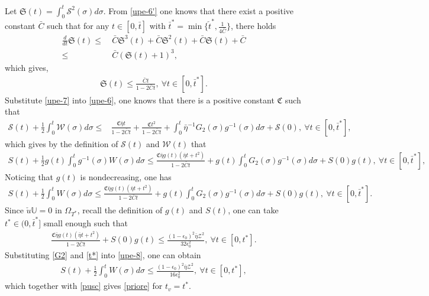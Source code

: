 \documentclass{amsart}
\numberwithin{equation}{section}
\begin{document}
Let $\mathfrak{S}(t)=\int_{0}^{t}\mathcal{S}^{2}(\sigma)d\sigma$. From \eqref{upe-6'} one knows that there exist a positive constant $\bar{C}$ such that for any $t\in[0,\bar{t}]$ with  $\bar{t}^{*}=\min\{\check{t}^{*},\frac{1}{4\bar{C}}\}$, there holds
\begin{align*}
\frac{d}{dt}\mathfrak{S}(t)
\leq&~\bar{C}\mathfrak{S}^{3}(t)
     +\bar{C}\mathfrak{S}^{2}(t)
     +\bar{C}\mathfrak{S}(t)
     +\bar{C}\\
\leq&~\bar{C}(\mathfrak{S}(t)+1)^{3},
\end{align*}
which gives,
\begin{align}\label{upe-7}
\mathfrak{S}(t)\leq \frac{\bar{C}t}{1-2\bar{C}t}, ~\forall t\in [0,\bar{t}^{*}].
\end{align}
Substitute \eqref{upe-7} into \eqref{upe-6}, one knows that there is a positive constant $\mathfrak{C}$ such that
\begin{align*}
\mathcal{S}(t)+\frac{1}{2}\int_{0}^{t}\mathcal{W}(\sigma)d\sigma
\leq& \frac{\mathfrak{C}\bar{\eta}t}{1-2\bar{C}t}
     +\frac{\mathfrak{C}t^{2}}{1-2\bar{C}t}
     +\int_{0}^{t}\bar{\eta}^{-1}G_{2}(\mathfrak{\sigma})g^{-1}(\sigma)d\sigma
     +\mathcal{S}(0),~\forall t\in[0,\bar{t}^{*}],
\end{align*}
which gives by the definition of $\mathcal{S}(t)$ and $\mathcal{W}(t)$ that
\begin{align*}
S(t)+\frac{1}{2}g(t)\int_{0}^{t}g^{-1}(\sigma)W(\sigma)d\sigma
\leq \frac{\mathfrak{C}\bar{\eta}g(t)(\bar{\eta}t+t^{2})}{1-2\bar{C}t}
     +g(t)\int_{0}^{t}G_{2}(\sigma)g^{-1}(\sigma)d\sigma
     +S(0)g(t),~\forall t\in[0,\bar{t}^{*}],
\end{align*}
Noticing that $g(t)$ is nondecreasing, one has
\begin{align}\label{upe-8}
S(t)+\frac{1}{2}\int_{0}^{t}W(\sigma)d\sigma
\leq \frac{\mathfrak{C}\bar{\eta}g(t)(\bar{\eta}t+t^{2})}{1-2\bar{C}t}
     +g(t)\int_{0}^{t}G_{2}(\sigma)g^{-1}(\sigma)d\sigma
     +S(0)g(t),~\forall t\in[0,\bar{t}^{*}].
\end{align}
Since $\check{u}\mathbb{U}=0$ in $\Omega_{T^{*}}$, recall the definition of $g(t)$ and $S(t)$, one can take $t^{*}\in(0,\bar{t}^{*}]$ small enough such that
\begin{align}\label{t*}
\frac{\mathfrak{C}\bar{\eta}g(t)(\bar{\eta}t+t^{2})}{1-2\bar{C}t}+S(0)g(t)
\leq \frac{(1-\epsilon_{0})^{2}\bar{\eta}\mathcal{Z}^{2}}{32\epsilon_{0}^{2}},~\forall t\in[0,t^{*}].
\end{align}
Substituting \eqref{G2} and \eqref{t*} into \eqref{upe-8}, one can obtain
\begin{align*}
S(t)+\frac{1}{2}\int_{0}^{t}W(\sigma)d\sigma
\leq \frac{(1-\epsilon_{0})^{2}\bar{\eta}\mathcal{Z}^{2}}{16\epsilon_{0}^{2}},~\forall t\in[0,t^{*}],
\end{align*}
which together with \eqref{pusc} gives \eqref{priore} for $t_{v}=t^{*}$.
\end{document}
